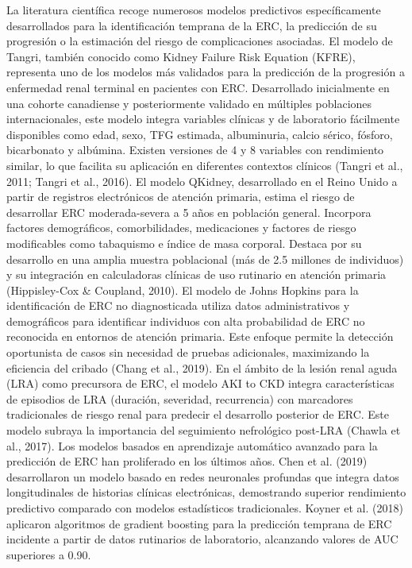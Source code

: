 \documentclass{article}
\begin{document}
\begin{multicols}{2}
La literatura científica recoge numerosos modelos predictivos específicamente desarrollados para la identificación temprana de la ERC, la predicción de su progresión o la estimación del riesgo de complicaciones asociadas.
El modelo de Tangri, también conocido como Kidney Failure Risk Equation (KFRE), representa uno de los modelos más validados para la predicción de la progresión a enfermedad renal terminal en pacientes con ERC. Desarrollado inicialmente en una cohorte canadiense y posteriormente validado en múltiples poblaciones internacionales, este modelo integra variables clínicas y de laboratorio fácilmente disponibles como edad, sexo, TFG estimada, albuminuria, calcio sérico, fósforo, bicarbonato y albúmina. Existen versiones de 4 y 8 variables con rendimiento similar, lo que facilita su aplicación en diferentes contextos clínicos (Tangri et al., 2011; Tangri et al., 2016).
El modelo QKidney, desarrollado en el Reino Unido a partir de registros electrónicos de atención primaria, estima el riesgo de desarrollar ERC moderada-severa a 5 años en población general. Incorpora factores demográficos, comorbilidades, medicaciones y factores de riesgo modificables como tabaquismo e índice de masa corporal. Destaca por su desarrollo en una amplia muestra poblacional (más de 2.5 millones de individuos) y su integración en calculadoras clínicas de uso rutinario en atención primaria (Hippisley-Cox \& Coupland, 2010).
El modelo de Johns Hopkins para la identificación de ERC no diagnosticada utiliza datos administrativos y demográficos para identificar individuos con alta probabilidad de ERC no reconocida en entornos de atención primaria. Este enfoque permite la detección oportunista de casos sin necesidad de pruebas adicionales, maximizando la eficiencia del cribado (Chang et al., 2019).
En el ámbito de la lesión renal aguda (LRA) como precursora de ERC, el modelo AKI to CKD integra características de episodios de LRA (duración, severidad, recurrencia) con marcadores tradicionales de riesgo renal para predecir el desarrollo posterior de ERC. Este modelo subraya la importancia del seguimiento nefrológico post-LRA (Chawla et al., 2017).
Los modelos basados en aprendizaje automático avanzado para la predicción de ERC han proliferado en los últimos años. Chen et al. (2019) desarrollaron un modelo basado en redes neuronales profundas que integra datos longitudinales de historias clínicas electrónicas, demostrando superior rendimiento predictivo comparado con modelos estadísticos tradicionales. Koyner et al. (2018) aplicaron algoritmos de gradient boosting para la predicción temprana de ERC incidente a partir de datos rutinarios de laboratorio, alcanzando valores de AUC superiores a 0.90.

\end{multicols}
\end{document}
